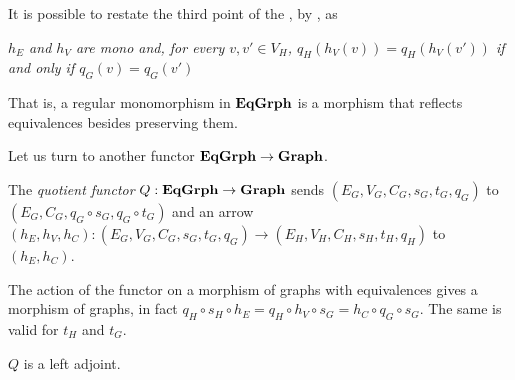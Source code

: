 \begin{remark}
    It is possible to restate the third point of the , by , as 
    \begin{displayquote}
    \textit{$h_E$ and $h_V$ are mono and, for every $v, v'\in V_H$, $q_H(h_V(v))=q_H(h_V(v'))$ if and only if $q_G(v)=q_G(v')$}
    \end{displayquote}
    That is, a regular monomorphism in $\mathbf{EqGrph}$ is a morphism that reflects equivalences besides preserving them.
\end{remark}

Let us turn to another functor $\mathbf{EqGrph}\to \mathbf{Graph}$.

\begin{definition}
The \emph{quotient functor} $Q:\mathbf{EqGrph}\to \mathbf{Graph} $ sends $(E_G, V_G, C_G, s_G, t_G, q_G)$ to $(E_G, C_G, q_G\circ s_G, q_G\circ t_G)$ and an arrow $(h_E, h_V, h_C) \colon (E_G, V_G, C_G, s_G, t_G, q_G)\to (E_H, V_H, C_H, s_H, t_H, q_H)$ to $(h_E, h_C)$.
\end{definition}

\begin{remark}
    The action of the functor on a morphism of graphs with equivalences gives a morphism of graphs, in fact $q_H \circ s_H \circ h_E = q_H \circ h_V \circ s_G = h_C \circ q_G \circ s_G$. The same is valid for $t_H$ and $t_G$. 
\end{remark}

\begin{lemma}
    $Q$ is a left adjoint.
\end{lemma}

